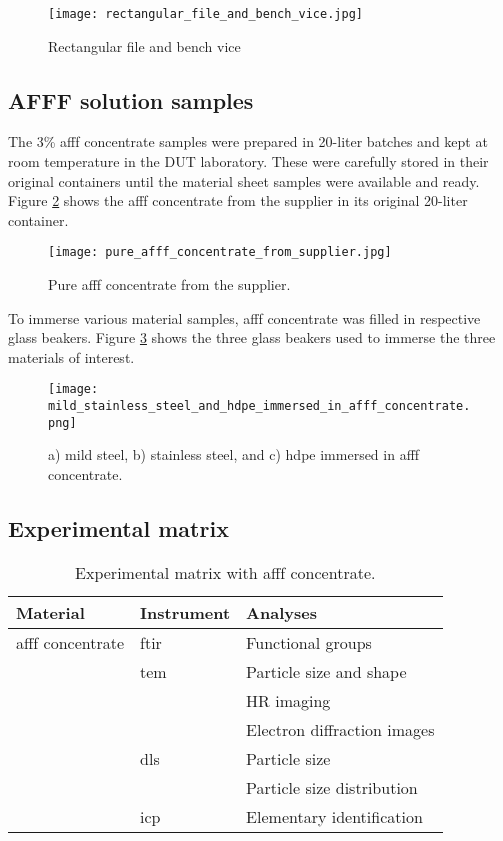 \begin{figure}[H]
    \centering
    \texttt{[image: rectangular\_file\_and\_bench\_vice.jpg]}
    \caption{Rectangular file and bench vice}
    \label{ch4:figure:file_and_vice}
\end{figure}

\subsection{AFFF solution samples}
The 3\% \acrshort{afff} concentrate samples were prepared in 20-liter batches and kept at room temperature in the DUT laboratory. These were carefully stored in their original containers until the material sheet samples were available and ready. Figure \ref{ch4:figure:suplier} shows the \acrshort{afff} concentrate from the supplier in its original 20-liter container.
 
\begin{figure}[H]
    \centering
    \texttt{[image: pure\_afff\_concentrate\_from\_supplier.jpg]}
    \caption{Pure \acrshort{afff} concentrate from the supplier.}
    \label{ch4:figure:suplier}
\end{figure}

To immerse various material samples, \acrshort{afff} concentrate was filled in respective glass beakers. Figure \ref{ch4:figure:immersed} shows the three glass beakers used to immerse the three materials of interest.
 
\begin{figure}[H]
\texttt{[image: mild\_stainless\_steel\_and\_hdpe\_immersed\_in\_afff\_concentrate.png]}
\caption{a) mild steel, b) stainless steel, and c) \acrshort{hdpe} immersed in \acrshort{afff} concentrate.}
\label{ch4:figure:immersed}
\end{figure}

\subsection{Experimental matrix}

\begin{table}[H]
\centering
\caption{Experimental matrix with \acrshort{afff} concentrate.}

\renewcommand{\arraystretch}{2.5}
\begin{tabularx}{\textwidth}{ XXX }
    \hline
    Material & Instrument & Analyses \\
    \hline
    \acrshort{afff} concentrate & \acrshort{ftir} & Functional groups \\
    & \acrshort{tem} & Particle size and shape \\
    & & HR imaging \\
    & & Electron diffraction images \\
    & \acrshort{dls} & Particle size \\
    & & Particle size distribution \\
    & \acrshort{icp} & Elementary identification \\
    \hline
\end{tabularx}

\end{table}

